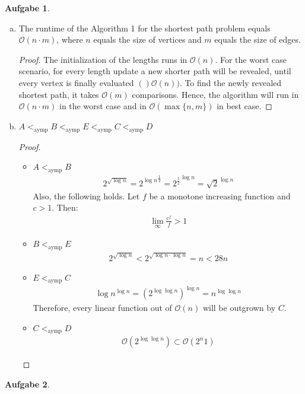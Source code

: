 \documentclass[a4paper,12pt,headsepline]{scrartcl}
\newtheorem{aufgabe}{Aufgabe}
\begin{document}
\begin{aufgabe}
\end{aufgabe}

\begin{enumerate}[a)]
	\item The runtime of the Algorithm 1 for the shortest path problem equals $\mathcal{O}(n\cdot m)$, where $n$ equals the size of vertices and $m$ equals the size of edges.
	\begin{proof}
		The initialization of the lengths runs in $\mathcal{O}(n)$. For the worst case scenario, for every length update a new shorter path will be revealed, until every vertex is finally evaluated $()\mathcal{O}(n))$. To find the newly revealed shortest path, it takes $\mathcal{O}(m)$ comparisons. Hence, the algorithm will run in $\mathcal{O}(n\cdot m)$ in the worst case and in $\mathcal{O}(\max\{n,m\})$ in best case.
	\end{proof}
	\item $A <_{\text{aymp}} B<_{\text{aymp}} E <_{\text{aymp}} C <_{\text{aymp}} D$
	\begin{proof}
		\begin{itemize}
			\item $A <_{\text{aymp}} B$
			\begin{align*}
				 2^{\sqrt{\log n}} = {2^{\log n}}^{\frac{1}{2}} = {2^{\frac{1}{2}}}^{\log n} = \sqrt{2}^{\log n}
			\end{align*}
			Also, the following holds. Let $f$ be a monotone increasing function and $c > 1$. Then:
			\begin{align*}
				\lim\limits_{\infty}\frac{c^f}{f} > 1
			\end{align*}
			\item $B <_{\text{aymp}} E$
			\begin{align*}
				2^{\sqrt{\log n}} < 2^{\sqrt{\log n \cdot \log n}} = n < 28n
			\end{align*}
			\item $E <_{\text{aymp}} C$
			\begin{align*}
				\log n^{\log n} = (2^{\log \log n})^{\log n}= n^{\log \log n}
			\end{align*}
			Therefore, every linear function out of $\mathcal{O}(n)$ will be outgrown by $C$.
			\item $C <_{\text{aymp}} D$
			\begin{align*}
				\mathcal{O}(2^{\log \log n}) \subset \mathcal{O}(2^n1)
			\end{align*}
		\end{itemize}
	\end{proof} 
\end{enumerate}
\newpage
\begin{aufgabe}
\end{aufgabe}
\end{document}
